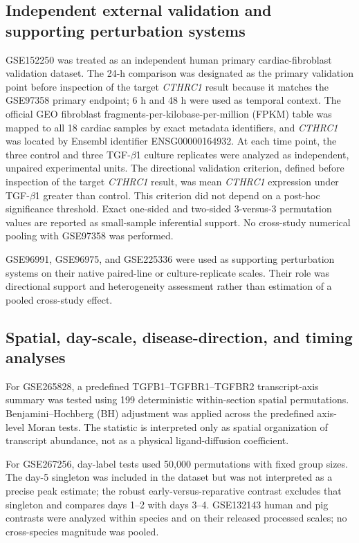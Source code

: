 \documentclass[preprint,11pt]{elsarticle}
\newcommand{\cthrc}{\textit{CTHRC1}}
\newcommand{\tgfb}{TGF-$\beta$1}
\begin{document}
\subsection{Independent external validation and supporting perturbation systems}
GSE152250 was treated as an independent human primary cardiac-fibroblast validation dataset. The 24-h comparison was designated as the primary validation point before inspection of the target \cthrc{} result because it matches the GSE97358 primary endpoint; 6 h and 48 h were used as temporal context. The official GEO fibroblast fragments-per-kilobase-per-million (FPKM) table was mapped to all 18 cardiac samples by exact metadata identifiers, and \cthrc{} was located by Ensembl identifier ENSG00000164932. At each time point, the three control and three \tgfb{} culture replicates were analyzed as independent, unpaired experimental units. The directional validation criterion, defined before inspection of the target \cthrc{} result, was mean \cthrc{} expression under \tgfb{} greater than control. This criterion did not depend on a post-hoc significance threshold. Exact one-sided and two-sided 3-versus-3 permutation values are reported as small-sample inferential support. No cross-study numerical pooling with GSE97358 was performed.

GSE96991, GSE96975, and GSE225336 were used as supporting perturbation systems on their native paired-line or culture-replicate scales. Their role was directional support and heterogeneity assessment rather than estimation of a pooled cross-study effect.

\subsection{Spatial, day-scale, disease-direction, and timing analyses}
For GSE265828, a predefined TGFB1--TGFBR1--TGFBR2 transcript-axis summary was tested using 199 deterministic within-section spatial permutations. Benjamini--Hochberg (BH) adjustment was applied across the predefined axis-level Moran tests. The statistic is interpreted only as spatial organization of transcript abundance, not as a physical ligand-diffusion coefficient.

For GSE267256, day-label tests used 50,000 permutations with fixed group sizes. The day-5 singleton was included in the dataset but was not interpreted as a precise peak estimate; the robust early-versus-reparative contrast excludes that singleton and compares days 1--2 with days 3--4. GSE132143 human and pig contrasts were analyzed within species and on their released processed scales; no cross-species magnitude was pooled.
\end{document}
